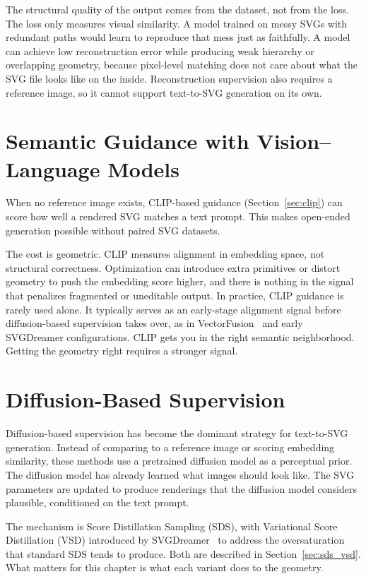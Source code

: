 The structural quality of the output comes from the dataset, not from the loss. The loss only measures visual similarity. A model trained on messy SVGs with redundant paths would learn to reproduce that mess just as faithfully. A model can achieve low reconstruction error while producing weak hierarchy or overlapping geometry, because pixel-level matching does not care about what the SVG file looks like on the inside. Reconstruction supervision also requires a reference image, so it cannot support text-to-SVG generation on its own.


\section{Semantic Guidance with Vision--Language Models}
\label{sec:clip_guidance}

When no reference image exists, CLIP-based guidance (Section~\ref{sec:clip}) can score how well a rendered SVG matches a text prompt. This makes open-ended generation possible without paired SVG datasets.

The cost is geometric. CLIP measures alignment in embedding space, not structural correctness. Optimization can introduce extra primitives or distort geometry to push the embedding score higher, and there is nothing in the signal that penalizes fragmented or uneditable output. In practice, CLIP guidance is rarely used alone. It typically serves as an early-stage alignment signal before diffusion-based supervision takes over, as in VectorFusion~\cite{jainVectorFusionTexttoSVGAbstracting2022} and early SVGDreamer configurations. CLIP gets you in the right semantic neighborhood. Getting the geometry right requires a stronger signal.


\section{Diffusion-Based Supervision}
\label{sec:diffusion_supervision}

Diffusion-based supervision has become the dominant strategy for text-to-SVG generation. Instead of comparing to a reference image or scoring embedding similarity, these methods use a pretrained diffusion model as a perceptual prior. The diffusion model has already learned what images should look like. The SVG parameters are updated to produce renderings that the diffusion model considers plausible, conditioned on the text prompt.

The mechanism is Score Distillation Sampling (SDS), with Variational Score Distillation (VSD) introduced by SVGDreamer~\cite{xingSVGDreamerTextGuided2024} to address the oversaturation that standard SDS tends to produce. Both are described in Section~\ref{sec:sds_vsd}. What matters for this chapter is what each variant does to the geometry.

